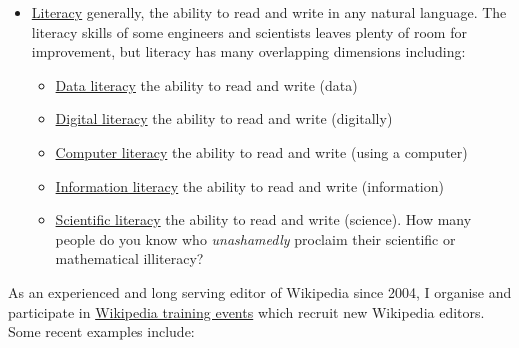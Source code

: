 \documentclass[
  12pt,
]{book}
\providecommand{\tightlist}{%
  \setlength{\itemsep}{0pt}\setlength{\parskip}{0pt}}
\begin{document}
\begin{itemize}
\tightlist
\item
  \href{https://en.wikipedia.org/wiki/Literacy}{Literacy} generally, the ability to read and write in any natural language. The literacy skills of some engineers and scientists leaves plenty of room for improvement, but literacy has many overlapping dimensions including:

  \begin{itemize}
  \tightlist
  \item
    \href{https://en.wikipedia.org/wiki/Data_literacy}{Data literacy} the ability to read and write (data)
  \item
    \href{https://en.wikipedia.org/wiki/Digital_literacy}{Digital literacy} the ability to read and write (digitally)
  \item
    \href{https://en.wikipedia.org/wiki/Computer_literacy}{Computer literacy} the ability to read and write (using a computer)
  \item
    \href{https://en.wikipedia.org/wiki/Information_literacy}{Information literacy} the ability to read and write (information)
  \item
    \href{https://en.wikipedia.org/wiki/Scientific_literacy}{Scientific literacy} the ability to read and write (science). How many people do you know who \emph{unashamedly} proclaim their scientific or mathematical illiteracy? \citep{nevergoodatmaths, gowersproblem, mathillit}
  \end{itemize}
\end{itemize}

As an experienced and long serving editor of Wikipedia since 2004, I organise and participate in \href{https://en.wikipedia.org/wiki/Edit-a-thon}{Wikipedia training events} which recruit new Wikipedia editors. Some recent examples include:
\end{document}
